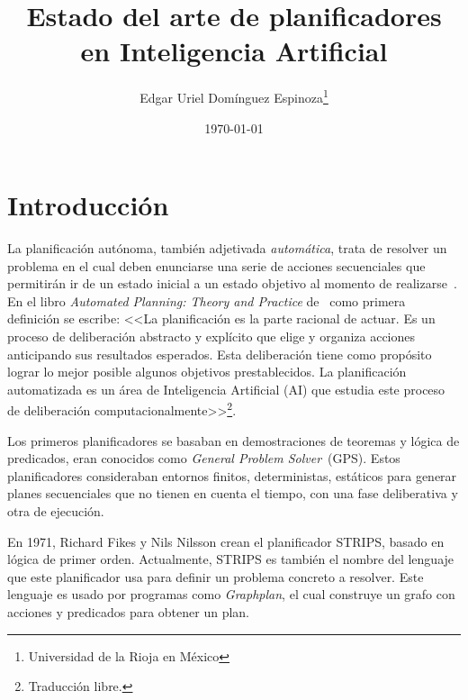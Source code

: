 \documentclass[a4paper,12pt,twocolumn]{article}
\title{Estado del arte de planificadores en Inteligencia Artificial}
\author{Edgar Uriel Domínguez Espinoza\thanks{Universidad de la Rioja en México}}
\date{\today}
\begin{document}
\maketitle


\section{Introducción}

La planificación autónoma, también adjetivada \emph{automática}, trata de resolver un problema en el cual deben enunciarse una serie de acciones secuenciales que permitirán ir de un estado inicial a un estado objetivo al momento de realizarse~\citep{Tapia_García_2017}. En el libro \emph{Automated Planning: Theory and Practice} de~\citet[cap. 1]{Ghallab_Nau_Traverso_2004} como primera definición se escribe: <<La planificación es la parte racional de actuar. Es un proceso de deliberación abstracto y explícito que elige y organiza acciones anticipando sus resultados esperados. Esta deliberación tiene como propósito lograr lo mejor posible algunos objetivos prestablecidos. La planificación automatizada es un área de Inteligencia Artificial (AI) que estudia este proceso de deliberación computacionalmente>>\footnote{Traducción libre.}.

Los primeros planificadores se basaban en demostraciones de teoremas y lógica de predicados, eran conocidos como \emph{General Problem Solver}~(GPS). Estos planificadores consideraban entornos finitos, deterministas, estáticos para generar planes secuenciales que no tienen en cuenta el tiempo, con una fase deliberativa y otra de ejecución.~\citep{Tapia_García_2017}

En 1971, Richard Fikes y Nils Nilsson crean el planificador STRIPS, basado en lógica de primer orden. Actualmente, STRIPS es también el nombre del lenguaje que este planificador usa para definir un problema concreto a resolver. Este lenguaje es usado por programas como \emph{Graphplan}, el cual construye un grafo con acciones y predicados para obtener un plan.~\citep{Tapia_García_2017}
\end{document}

